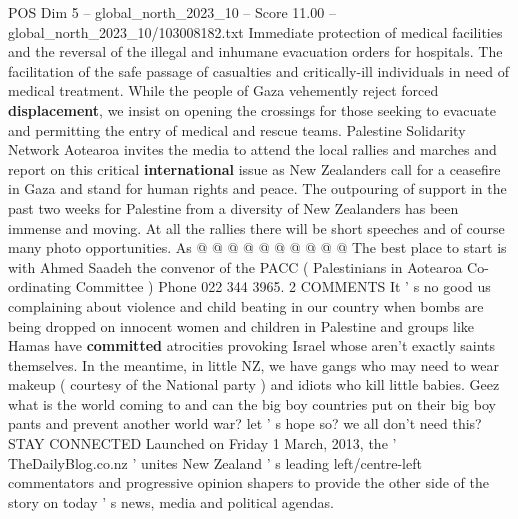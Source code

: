 \begin{textsample}{POS Dim 5 – global\_north\_2023\_10 – Score 11.00 – global\_north\_2023\_10/103008182.txt}
Immediate protection of medical facilities and the reversal of the illegal and inhumane evacuation orders for hospitals.
The facilitation of the safe passage of casualties and critically-ill individuals in need of medical treatment.
While the people of Gaza vehemently reject forced \textbf{displacement}, we insist on opening the crossings for those seeking to evacuate and permitting the entry of medical and rescue teams.
Palestine Solidarity Network Aotearoa invites the media to attend the local rallies and marches and report on this critical \textbf{international} issue as New Zealanders call for a ceasefire in Gaza and stand for human rights and peace.
The outpouring of support in the past two weeks for Palestine from a diversity of New Zealanders has been immense and moving.
At all the rallies there will be short speeches and of course many photo opportunities.
As @ @ @ @ @ @ @ @ @ @ The best place to start is with Ahmed Saadeh the convenor of the PACC ( Palestinians in Aotearoa Co-ordinating Committee ) Phone 022 344 3965. 2 COMMENTS It ' s no good us complaining about violence and child beating in our country when bombs are being dropped on innocent women and children in Palestine and groups like Hamas have \textbf{committed} atrocities provoking Israel whose aren't exactly saints themselves.
In the meantime, in little NZ, we have gangs who may need to wear makeup ( courtesy of the National party ) and idiots who kill little babies.
Geez what is the world coming to and can the big boy countries put on their big boy pants and prevent another world war? let ' s hope so? we all don't need this?
STAY CONNECTED Launched on Friday 1 March, 2013, the ' TheDailyBlog.co.nz ' unites New Zealand ' s leading left/centre-left commentators and progressive opinion shapers to provide the other side of the story on today ' s news, media and political agendas.

\end{textsample}
